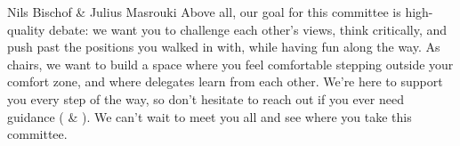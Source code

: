 \begin{chairletter}{Nils Bischof \& Julius Masrouki}
Above all, our goal for this committee is high-quality debate: we want you to challenge each other’s views, think critically, and push past the positions you walked in with, while having fun along the way. As chairs, we want to build a space where you feel comfortable stepping outside your comfort zone, and where delegates learn from each other. We’re here to support you every step of the way, so don’t hesitate to reach out if you ever need guidance ( \& ). We can’t wait to meet you all and see where you take this committee.

\end{chairletter}
